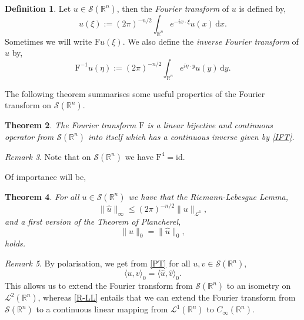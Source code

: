 \documentclass[a4paper, 12pt]{report}
\newtheorem{theorem}{Theorem}[section]
\theoremstyle{cor}
\theoremstyle{remark}
\newtheorem{remark}[theorem]{Remark}
\theoremstyle{definition}
\newtheorem{defn}[theorem]{Definition}
\begin{document}
\begin{defn}
Let $u \in \mathcal{S}(\mathbb{R}^n)$, then the \emph{Fourier transform} of $u$ is defined by,
\begin{equation}
\hat{u}(\xi) := (2\pi)^{-n/2}\int_{\mathbb{R}^n}e^{-ix\cdot\xi}u(x)\,\mathrm{d}x.
\end{equation}
Sometimes we will write $\mathrm{F}u(\xi)$.  We also define the \emph{inverse Fourier transform} of $u$ by,
\begin{equation}
\mathrm{F}^{-1}u(\eta) := (2\pi)^{-n/2}\int_{\mathbb{R}^n}e^{i\eta\cdot y}u(y)\,\mathrm{d}y.\label{IFT}
\end{equation}
\end{defn}
The following theorem summarises some useful properties of the Fourier transform on $\mathcal{S}(\mathbb{R}^n)$.

\begin{theorem}
The Fourier transform $\mathrm{F}$ is a linear bijective and continuous operator from $\mathcal{S}(\mathbb{R}^n)$ into itself which has a continuous inverse given by \eqref{IFT}.
\end{theorem}
\begin{remark}
Note that on $\mathcal{S}(\mathbb{R}^n)$ we have $\mathrm{F}^4 = \mathrm{id}$.
\end{remark}
Of importance will be,
\begin{theorem}
For all $u \in \mathcal{S}(\mathbb{R}^n)$ we have that the Riemann-Lebesgue Lemma,
\begin{equation}
\|\hat{u}\|_\infty \le (2\pi)^{-n/2}\|u\|_{\mathcal{L}^1},\label{R-LL}
\end{equation}
and a first version of the Theorem of Plancherel,
\begin{equation}
\|u\|_0 = \|\hat{u}\|_0,\label{PT}
\end{equation}
holds.
\end{theorem}
\begin{remark}
By polarisation, we get from \eqref{PT} for all $u, v \in \mathcal{S}(\mathbb{R}^n)$,
\begin{equation}
\langle u, v\rangle_0 = \langle\hat{u}, \hat{v}\rangle_0.
\end{equation}
This allows us to extend the Fourier transform from $\mathcal{S}(\mathbb{R}^n)$ to an isometry on $\mathcal{L}^2(\mathbb{R}^n)$, whereas \eqref{R-LL} entails that we can extend the Fourier transform from $\mathcal{S}(\mathbb{R}^n)$ to a continuous linear mapping from $\mathcal{L}^1(\mathbb{R}^n)$ to $C_\infty(\mathbb{R}^n)$.
\end{remark}
\end{document}
